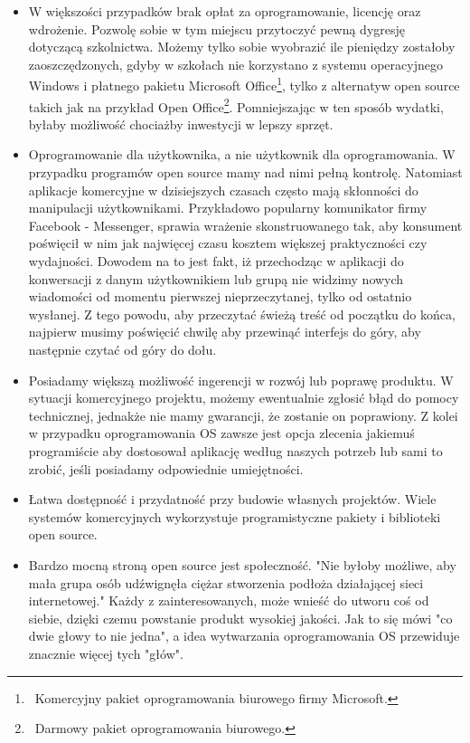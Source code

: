 \documentclass{article}
\begin{document}
\begin{itemize}
    \item W większości przypadków brak opłat za oprogramowanie, licencję oraz wdrożenie. Pozwolę sobie w tym miejscu przytoczyć pewną dygresję dotyczącą szkolnictwa. Możemy tylko sobie wyobrazić ile pieniędzy zostałoby zaoszczędzonych, gdyby w szkołach nie korzystano z systemu operacyjnego Windows i płatnego pakietu Microsoft Office\footnote{\, Komercyjny pakiet oprogramowania biurowego firmy Microsoft.}, tylko z alternatyw open source takich jak na przykład Open Office\footnote{\, Darmowy pakiet oprogramowania biurowego.}. Pomniejszając w ten sposób wydatki, byłaby możliwość chociażby inwestycji w lepszy sprzęt.
    
    \item Oprogramowanie dla użytkownika, a nie użytkownik dla oprogramowania. W przypadku programów open source mamy nad nimi pełną kontrolę. Natomiast aplikacje komercyjne w dzisiejszych czasach często mają skłonności do manipulacji użytkownikami. Przykładowo popularny komunikator firmy Facebook - Messenger, sprawia wrażenie skonstruowanego tak, aby konsument poświęcił w nim jak najwięcej czasu kosztem większej praktyczności czy wydajności. Dowodem na to jest fakt, iż przechodząc w aplikacji do konwersacji z danym użytkownikiem lub grupą nie widzimy nowych wiadomości od momentu pierwszej nieprzeczytanej, tylko od ostatnio wysłanej. Z tego powodu, aby przeczytać świeżą treść od początku do końca, najpierw musimy poświęcić chwilę aby przewinąć interfejs do góry, aby następnie czytać od góry do dołu.
    
    \item Posiadamy większą możliwość ingerencji w rozwój lub poprawę produktu. W sytuacji komercyjnego projektu, możemy ewentualnie zgłosić błąd do pomocy technicznej, jednakże nie mamy gwarancji, że zostanie on poprawiony. Z kolei w przypadku oprogramowania OS zawsze jest opcja zlecenia jakiemuś programiście aby dostosował aplikację według naszych potrzeb lub sami to zrobić, jeśli posiadamy odpowiednie umiejętności.
    
    \item Łatwa dostępność i przydatność przy budowie własnych projektów. Wiele systemów komercyjnych wykorzystuje programistyczne pakiety i biblioteki open source.
    
    \item Bardzo mocną stroną open source jest społeczność. "Nie byłoby możliwe, aby mała grupa osób udźwignęła ciężar stworzenia podłoża działającej sieci internetowej\cite{Kotula}." Każdy z zainteresowanych, może wnieść do utworu coś od siebie, dzięki czemu powstanie produkt wysokiej jakości. Jak to się mówi "co dwie głowy to nie jedna", a idea wytwarzania oprogramowania OS przewiduje znacznie więcej tych "głów".
    

\end{itemize}
\end{document}
